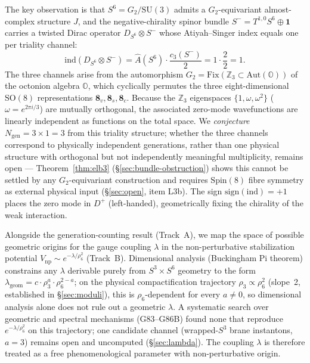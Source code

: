 \documentclass[12pt,a4paper]{article}
\newcommand{\ind}{\mathrm{ind}}
\newcommand{\OC}{\mathbb{O}}    %
\newcommand{\ZZ}{\mathbb{Z}}
\begin{document}
The key observation is that $S^6 = G_2/\mathrm{SU}(3)$ admits a $G_2$-equivariant
almost-complex structure $J$, and the negative-chirality spinor bundle
$S^- = T^{1,0}S^6\oplus\mathbf{1}$ carries a twisted Dirac operator $D_{S^6}\otimes S^-$
whose Atiyah--Singer index equals one per triality channel:
\begin{equation}
  \ind(D_{S^6}\otimes S^-) = \hat{A}(S^6)\cdot\frac{c_3(S^-)}{2}
  = 1\cdot\frac{2}{2} = 1.
\end{equation}
The three channels arise from the automorphism $G_2 = \mathrm{Fix}(\ZZ_3\subset
\mathrm{Aut}(\OC))$ of the octonion algebra $\OC$, which cyclically permutes the
three eight-dimensional $\mathrm{SO}(8)$ representations $\mathbf{8}_v, \mathbf{8}_s,
\mathbf{8}_c$. Because the $\ZZ_3$ eigenspaces $\{1,\omega,\omega^2\}$
($\omega=e^{2\pi i/3}$) are mutually orthogonal, the associated zero-mode
wavefunctions are linearly independent as functions on the total space.
We \emph{conjecture} $N_{\mathrm{gen}}=3\times 1=3$ from this triality structure;
whether the three channels correspond to physically independent generations,
rather than one physical structure with orthogonal but not independently
meaningful multiplicity, remains open --- Theorem~\ref{thm:elb3}
(\S\ref{sec:bundle-obstruction}) shows this cannot be settled by any
$G_2$-equivariant construction and requires $\mathrm{Spin}(8)$ fibre symmetry as
external physical input (\S\ref{sec:open}, item L3b). The sign $\mathrm{sign}(\ind)=+1$ places the
zero mode in $D^+$ (left-handed), geometrically fixing the chirality of the weak
interaction.

Alongside the generation-counting result (Track~A), we map the space of possible
geometric origins for the gauge coupling $\lambda$ in the non-perturbative stabilization
potential $V_{\mathrm{np}}\sim e^{-\lambda/\rho_6^2}$ (Track~B). Dimensional analysis
(Buckingham Pi theorem) constrains any $\lambda$ derivable purely from $S^3\times S^6$
geometry to the form $\lambda_{\mathrm{geom}} = c\cdot\rho_3^a\cdot\rho_6^{2-a}$; on the
physical compactification trajectory $\rho_3\propto\rho_6^2$ (slope~2, established in
\S\ref{sec:moduli}), this is $\rho_6$-dependent for every $a\neq 0$, so dimensional
analysis alone does not rule out a geometric $\lambda$. A systematic search over
geometric and spectral mechanisms (G83--G86B) found none that reproduce
$e^{-\lambda/\rho_6^2}$ on this trajectory; one candidate channel (wrapped-$S^3$ brane
instantons, $a=3$) remains open and uncomputed (\S\ref{sec:lambda}). The coupling
$\lambda$ is therefore treated as a free phenomenological parameter with
non-perturbative origin.
\end{document}

